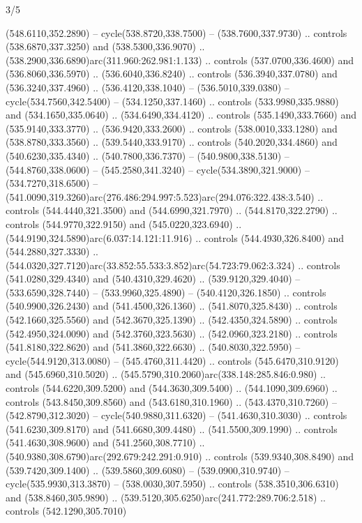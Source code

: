 \begin{flagdescription}{3/5}
\begin{scope}[xshift=0.5\flaglength,yshift=0.5\flagwidth,scale=\flagwidth/602.3]
\begin{scope}[y=0.8pt, x=0.8pt, yscale=-1, shift={(-600,-330)}]
  (548.6110,352.2890) -- cycle(538.8720,338.7500) -- (538.7600,337.9730) ..
  controls (538.6870,337.3250) and (538.5300,336.9070) ..
  (538.2900,336.6890)arc(311.960:262.981:1.133) .. controls (537.0700,336.4600)
  and (536.8060,336.5970) .. (536.6040,336.8240) .. controls (536.3940,337.0780)
  and (536.3240,337.4960) .. (536.4120,338.1040) -- (536.5010,339.0380) --
  cycle(534.7560,342.5400) -- (534.1250,337.1460) .. controls
  (533.9980,335.9880) and (534.1650,335.0640) .. (534.6490,334.4120) .. controls
  (535.1490,333.7660) and (535.9140,333.3770) .. (536.9420,333.2600) .. controls
  (538.0010,333.1280) and (538.8780,333.3560) .. (539.5440,333.9170) .. controls
  (540.2020,334.4860) and (540.6230,335.4340) .. (540.7800,336.7370) --
  (540.9800,338.5130) -- (544.8760,338.0600) -- (545.2580,341.3240) --
  cycle(534.3890,321.9000) -- (534.7270,318.6500) --
  (541.0090,319.3260)arc(276.486:294.997:5.523)arc(294.076:322.438:3.540) ..
  controls (544.4440,321.3500) and (544.6990,321.7970) .. (544.8170,322.2790) ..
  controls (544.9770,322.9150) and (545.0220,323.6940) ..
  (544.9190,324.5890)arc(6.037:14.121:11.916) .. controls (544.4930,326.8400)
  and (544.2880,327.3330) ..
  (544.0320,327.7120)arc(33.852:55.533:3.852)arc(54.723:79.062:3.324) ..
  controls (541.0280,329.4340) and (540.4310,329.4620) .. (539.9120,329.4040) --
  (533.6590,328.7440) -- (533.9960,325.4890) -- (540.4120,326.1850) .. controls
  (540.9900,326.2430) and (541.4500,326.1360) .. (541.8070,325.8430) .. controls
  (542.1660,325.5560) and (542.3670,325.1390) .. (542.4350,324.5890) .. controls
  (542.4950,324.0090) and (542.3760,323.5630) .. (542.0960,323.2180) .. controls
  (541.8180,322.8620) and (541.3860,322.6630) .. (540.8030,322.5950) --
  cycle(544.9120,313.0080) -- (545.4760,311.4420) .. controls
  (545.6470,310.9120) and (545.6960,310.5020) ..
  (545.5790,310.2060)arc(338.148:285.846:0.980) .. controls (544.6220,309.5200)
  and (544.3630,309.5400) .. (544.1090,309.6960) .. controls (543.8450,309.8560)
  and (543.6180,310.1960) .. (543.4370,310.7260) -- (542.8790,312.3020) --
  cycle(540.9880,311.6320) -- (541.4630,310.3030) .. controls
  (541.6230,309.8170) and (541.6680,309.4480) .. (541.5500,309.1990) .. controls
  (541.4630,308.9600) and (541.2560,308.7710) ..
  (540.9380,308.6790)arc(292.679:242.291:0.910) .. controls (539.9340,308.8490)
  and (539.7420,309.1400) .. (539.5860,309.6080) -- (539.0900,310.9740) --
  cycle(535.9930,313.3870) -- (538.0030,307.5950) .. controls
  (538.3510,306.6310) and (538.8460,305.9890) ..
  (539.5120,305.6250)arc(241.772:289.706:2.518) .. controls (542.1290,305.7010)

\end{scope}
\end{scope}
\end{flagdescription}
